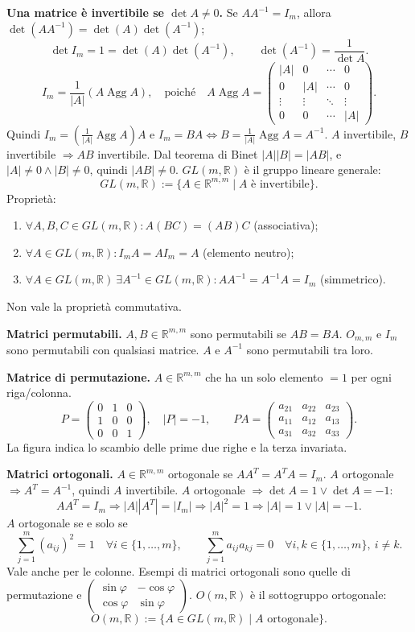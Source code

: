 \documentclass[11pt,a4paper]{article}
\newcommand{\pagina}[1]{\clearpage}
\begin{document}
\textbf{Una matrice è invertibile se $\det A\ne0$.}
Se $AA^{-1}=I_m$, allora $\det(AA^{-1})=\det(A)\det(A^{-1})$;
\[\det I_m=1=\det(A)\det(A^{-1}),\qquad \det(A^{-1})=\frac1{\det A}.\]
\[I_m=\frac1{|A|}(A\operatorname{Agg}A),\quad\text{poiché}\quad
A\operatorname{Agg}A=\begin{pmatrix}|A|&0&\cdots&0\\0&|A|&\cdots&0\\\vdots&\vdots&\ddots&\vdots\\0&0&\cdots&|A|\end{pmatrix}.\]
Quindi $I_m=(\frac1{|A|}\operatorname{Agg}A)A$ e $I_m=BA\Longleftrightarrow B=\frac1{|A|}\operatorname{Agg}A=A^{-1}$.
$A$ invertibile, $B$ invertibile $\Longrightarrow AB$ invertibile. Dal teorema di Binet $|A||B|=|AB|$, e $|A|\ne0\wedge|B|\ne0$, quindi $|AB|\ne0$.
\pagina{16}
$GL(m,\mathbb R)$ è il gruppo lineare generale:
\[GL(m,\mathbb R):=\{A\in\mathbb R^{m,m}\mid A\text{ è invertibile}\}.\]
Proprietà:
\begin{enumerate}
\item $\forall A,B,C\in GL(m,\mathbb R):A(BC)=(AB)C$ (associativa);
\item $\forall A\in GL(m,\mathbb R):I_mA=AI_m=A$ (elemento neutro);
\item $\forall A\in GL(m,\mathbb R)\ \exists A^{-1}\in GL(m,\mathbb R):AA^{-1}=A^{-1}A=I_m$ (simmetrico).
\end{enumerate}
Non vale la proprietà commutativa.

\textbf{Matrici permutabili.} $A,B\in\mathbb R^{m,m}$ sono permutabili se $AB=BA$. $O_{m,m}$ e $I_m$ sono permutabili con qualsiasi matrice. $A$ e $A^{-1}$ sono permutabili tra loro.

\textbf{Matrice di permutazione.} $A\in\mathbb R^{m,m}$ che ha un solo elemento $=1$ per ogni riga/colonna.
\[P=\begin{pmatrix}0&1&0\\1&0&0\\0&0&1\end{pmatrix},\quad|P|=-1,\qquad
PA=\begin{pmatrix}a_{21}&a_{22}&a_{23}\\a_{11}&a_{12}&a_{13}\\a_{31}&a_{32}&a_{33}\end{pmatrix}.\]
La figura indica lo scambio delle prime due righe e la terza invariata.

\textbf{Matrici ortogonali.} $A\in\mathbb R^{m,m}$ ortogonale se $AA^T=A^TA=I_m$.
\pagina{17}
$A$ ortogonale $\Longrightarrow A^T=A^{-1}$, quindi $A$ invertibile.
$A$ ortogonale $\Longrightarrow\det A=1\vee\det A=-1$:
\[AA^T=I_m\Longrightarrow|A||A^T|=|I_m|\Longrightarrow|A|^2=1\Longrightarrow|A|=1\vee|A|=-1.\]
$A$ ortogonale se e solo se
\[\sum_{j=1}^m(a_{ij})^2=1\quad\forall i\in\{1,\ldots,m\},\qquad
\sum_{j=1}^m a_{ij}a_{kj}=0\quad\forall i,k\in\{1,\ldots,m\},\ i\ne k.\]
Vale anche per le colonne. Esempi di matrici ortogonali sono quelle di permutazione e $\begin{pmatrix}\sin\varphi&-\cos\varphi\\\cos\varphi&\sin\varphi\end{pmatrix}$.
$O(m,\mathbb R)$ è il sottogruppo ortogonale:
\[O(m,\mathbb R):=\{A\in GL(m,\mathbb R)\mid A\text{ ortogonale}\}.\]
\end{document}
